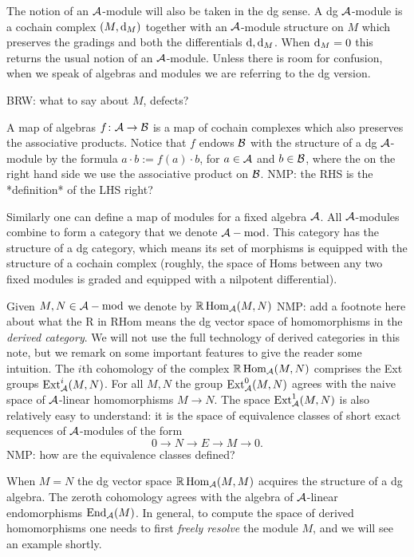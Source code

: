 \documentclass[11pt]{amsart}
\def\brian#1{{\textcolor{blue!65!red}{BRW: {#1}}}}
\def\natalie#1{{\textcolor{green!65!black}{NMP: {#1}}}}
\begin{document}
The notion of an $\mathcal A$-module will also be taken in the dg sense. A dg $\mathcal A$-module is a cochain complex $(M, {\rm d}_M)$ together with an $\mathcal A$-module structure on $M$ which preserves the gradings and both the differentials ${\rm d}, {\rm d}_M$. 
When ${\rm d}_M = 0$ this returns the usual notion of an $\mathcal A$-module. 
Unless there is room for confusion, when we speak of algebras and modules we are referring to the dg version.

\brian{what to say about $M$, defects?}
 
A map of algebras $f \colon \mathcal A \to \mathcal B$ is a map of cochain complexes which also preserves the associative products.
Notice that $f$ endows $\mathcal B$ with the structure of a dg $\mathcal A$-module by the formula $a \cdot b := f(a) \cdot b$, for $a \in \mathcal A$ and $b \in \mathcal B$, where the on the right hand side we use the associative product on $\mathcal B$.  \natalie{the RHS is the *definition* of the LHS right?}

Similarly one can define a map of modules for a fixed algebra $\mathcal A$.  All $\mathcal A$-modules combine to form a category that we denote $\mathcal A-{\rm mod}$.
This category has the structure of a dg category, which means its set of morphisms is equipped with the structure of a cochain complex (roughly, the space of Homs between any two fixed modules is graded and equipped with a nilpotent differential). 

Given $M,N \in \mathcal A-{\rm mod}$ we denote by $\mathbb{R}\operatorname{Hom}_\mathcal A(M,N)$ \natalie{add a footnote here about what the R in RHom means} the dg vector space of homomorphisms in the {\em derived category}. 
We will not use the full technology of derived categories in this note, but we remark on some important features to give the reader some intuition. 
The $i$th cohomology of the complex $\mathbb{R}\operatorname{Hom}_{\mathcal A} (M,N)$ comprises the Ext groups ${\rm Ext}^i_{\mathcal A}(M,N)$. 
For all $M,N$ the group ${\rm Ext}^0_{\mathcal A}(M,N)$ agrees with the naive space of $\mathcal A$-linear homomorphisms $M \to N$. 
The space ${\rm Ext}^1_{\mathcal A}(M,N)$ is also relatively easy to understand: it is the space of equivalence classes of short exact sequences of $\mathcal A$-modules of the form
\[
0 \to N \to E \to M \to 0 .
\]
\natalie{how are the equivalence classes defined?}

When $M = N$ the dg vector space $\mathbb{R}\operatorname{Hom}_\mathcal A(M,M)$ acquires the structure of a dg algebra.
The zeroth cohomology agrees with the algebra of $\mathcal A$-linear endomorphisms ${\rm End}_{\mathcal A}(M)$.  
In general, to compute the space of derived homomorphisms one needs to first \textit{freely resolve} the module $M$, and we will see an example shortly.
\end{document}
